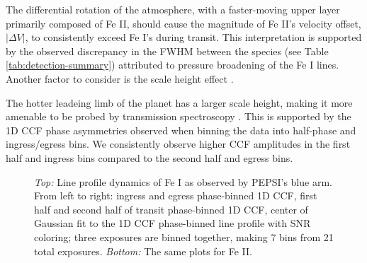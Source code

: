 \documentclass[twocolumn]{aastex631}
\begin{document}
            The differential rotation of the atmosphere, with a faster-moving upper layer primarily composed of Fe II, should cause the magnitude of Fe II's velocity offset, $|\Delta V|$, to consistently exceed Fe I's during transit. This interpretation is supported by the observed discrepancy in the FWHM between the species (see Table \ref{tab:detection-summary}) attributed to pressure broadening of the Fe I lines. Another factor to consider is the scale height effect \citep{Savel2023}. 
            
            The hotter leadeing limb of the planet has a larger scale height, making it more amenable to be probed by transmission spectroscopy \citep{Prinoth2023}. This is supported by the 1D CCF phase asymmetries observed when binning the data into half-phase and ingress/egress bins. We consistently observe higher CCF amplitudes in the first half and ingress bins compared to the second half and egress bins.

            

        \begin{figure} \label{fig:phase-binned-1d-ccfs-Fe/Fe+}
            \centering
            \caption{\textit{Top:} Line profile dynamics of Fe I as observed by PEPSI's blue arm. From left to right: ingress and egress phase-binned 1D CCF, first half and second half of transit phase-binned 1D CCF, center of Gaussian fit to the 1D CCF phase-binned line profile with SNR coloring; three exposures are binned together, making 7 bins from 21 total exposures. \textit{Bottom:} The same plots for Fe II.}
        \end{figure}
\end{document}
